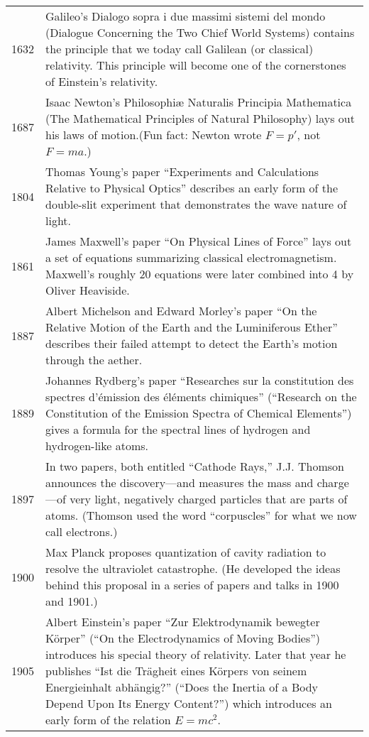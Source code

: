 \documentclass[../main.tex]{subfiles}
\begin{document}
\begin{center}
    \begin{longtable}{p{}  p{}}
    1632&Galileo's Dialogo sopra i due massimi sistemi del mondo (Dialogue Concerning the Two Chief World Systems) contains the principle that we today call Galilean (or classical) relativity. This principle will become one of the cornerstones of Einstein's relativity.\\
1687&Isaac Newton's Philosophiæ Naturalis Principia Mathematica (The Mathematical Principles of Natural  Philosophy) lays out his laws of motion.(Fun fact: Newton wrote $F = p'$, not $F = ma$.)\\
1804&Thomas Young's paper “Experiments and Calculations Relative to Physical Optics” describes an early form of the double-slit experiment that demonstrates the wave nature of light.\\
1861&James Maxwell's paper “On Physical Lines of Force” lays out a set of equations summarizing classical electromagnetism. Maxwell's roughly 20 equations were later combined into 4 by Oliver Heaviside.\\
1887&Albert Michelson and Edward Morley's paper “On the Relative Motion of the Earth and the Luminiferous Ether” describes their failed attempt to detect the Earth's motion through the aether.\\
1889&Johannes Rydberg's paper “Researches sur la constitution des spectres d'émission des éléments chimiques” (“Research on the Constitution of the Emission Spectra of Chemical Elements”) gives a formula for the spectral lines of hydrogen and hydrogen-like atoms.\\
1897&In two papers, both entitled “Cathode Rays,” J.J. Thomson announces the discovery—and measures the mass and charge—of very light, negatively charged particles that are parts of atoms. (Thomson used the word “corpuscles” for what we now call electrons.) \\
1900&Max Planck proposes quantization of cavity radiation to resolve the ultraviolet catastrophe. (He developed the ideas behind this proposal in a series of papers and talks in 1900 and 1901.)\\
1905&Albert Einstein's paper “Zur Elektrodynamik bewegter Körper” (“On the Electrodynamics of Moving Bodies”) introduces his special theory of relativity. Later that year he publishes “Ist die Trägheit eines Körpers von seinem Energieinhalt abhängig?” (“Does the Inertia of a Body Depend Upon Its Energy Content?”) which introduces an early form of the relation $E = mc^2$.\\

\end{longtable}
\end{center}
\end{document}
